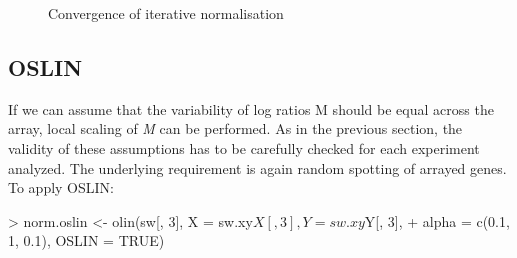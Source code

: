 \documentclass[a4paper,11pt]{article}
\begin{document}
\begin{figure}[t]
\centering
{}
\caption{Convergence of iterative normalisation }
\label{iter}
\end{figure}




\subsection{OSLIN} 
If we can assume that the variability of log ratios M should be equal across the array,
 local scaling of \emph{M} can be performed. As in the previous section, the validity of these assumptions
 has to be carefully checked for each experiment analyzed. The underlying requirement is again random 
spotting of arrayed genes. To apply OSLIN:

\begin{Schunk}
\begin{Sinput}
> norm.oslin <- olin(sw[, 3], X = sw.xy$X[, 3], Y = sw.xy$Y[, 3], 
+     alpha = c(0.1, 1, 0.1), OSLIN = TRUE)
\end{Sinput}
\end{Schunk}
\end{document}
